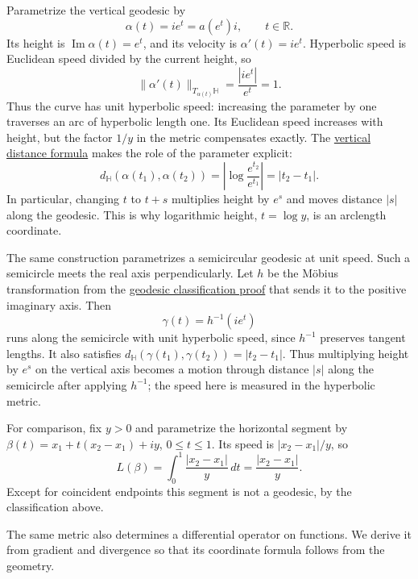 \begin{example}\label{hyperbolic.vertical-flow}
Parametrize the vertical geodesic by
\[
 \alpha(t)=ie^t=a(e^t)i,\qquad t\in\mathbb R.
\]
Its height is $\operatorname{Im}\alpha(t)=e^t$, and its velocity is $\alpha'(t)=ie^t$. Hyperbolic speed is Euclidean speed divided by the current height, so
\[
 \|\alpha'(t)\|_{T_{\alpha(t)}\mathbb H}
 =\frac{|ie^t|}{e^t}=1.
\]
Thus the curve has unit hyperbolic speed: increasing the parameter by one traverses an arc of hyperbolic length one. Its Euclidean speed increases with height, but the factor $1/y$ in the metric compensates exactly. The \hyperref[hyperbolic.vertical-geodesics]{vertical distance formula} makes the role of the parameter explicit:
\[
 d_{\mathbb H}(\alpha(t_1),\alpha(t_2))
 =\left|\log\frac{e^{t_2}}{e^{t_1}}\right|
 =|t_2-t_1|.
\]
In particular, changing $t$ to $t+s$ multiplies height by $e^s$ and moves distance $|s|$ along the geodesic. This is why logarithmic height, $t=\log y$, is an arclength coordinate.

The same construction parametrizes a semicircular geodesic at unit speed. Such a semicircle meets the real axis perpendicularly. Let $h$ be the M\"obius transformation from the \hyperref[hyperbolic.geodesics]{geodesic classification proof} that sends it to the positive imaginary axis. Then
\[
 \gamma(t)=h^{-1}(ie^t)
\]
runs along the semicircle with unit hyperbolic speed, since $h^{-1}$ preserves tangent lengths. It also satisfies $d_{\mathbb H}(\gamma(t_1),\gamma(t_2))=|t_2-t_1|$. Thus multiplying height by $e^s$ on the vertical axis becomes a motion through distance $|s|$ along the semicircle after applying $h^{-1}$; the speed here is measured in the hyperbolic metric.

For comparison, fix $y>0$ and parametrize the horizontal segment by $\beta(t)=x_1+t(x_2-x_1)+iy$, $0\leq t\leq1$. Its speed is $|x_2-x_1|/y$, so
\begin{equation}\label{eq:horizontal-segment-length}
 L(\beta)=\int_0^1\frac{|x_2-x_1|}{y}\,dt
 =\frac{|x_2-x_1|}{y}.
\end{equation}
Except for coincident endpoints this segment is not a geodesic, by the classification above.
\end{example}

The same metric also determines a differential operator on functions. We derive it from gradient and divergence so that its coordinate formula follows from the geometry.

